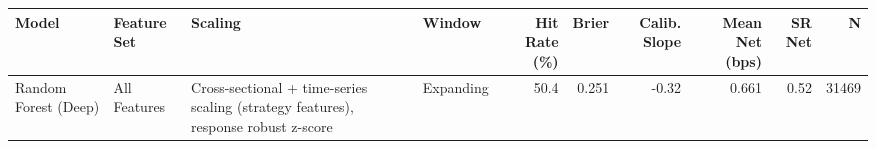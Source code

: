 \begin{tabular}{llllrrrrrr}
\toprule
Model & Feature Set & Scaling & Window & Hit Rate (\%) & Brier & Calib. Slope & Mean Net (bps) & SR Net & N \\
\midrule
Random Forest (Deep) & All Features & Cross-sectional + time-series scaling (strategy features), response robust z-score & Expanding & 50.4 & 0.251 & -0.32 & 0.661 & 0.52 & 31469 \\
\bottomrule
\end{tabular}
